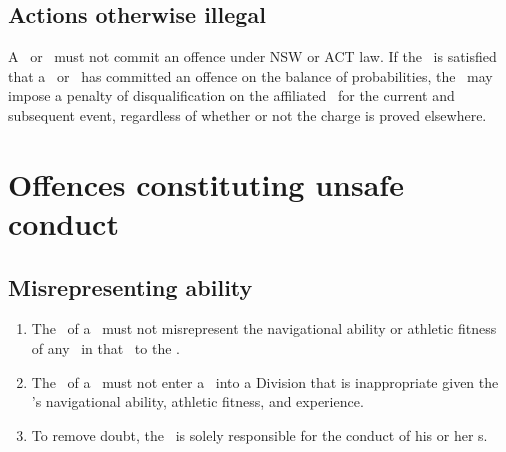 \documentclass[12pt]{report}
\begin{document}
  \section{Actions otherwise illegal}
  \begin{fenumerate}\item
  A \competitor\ or \spectator\ must not commit an offence under NSW or ACT law. If the \Referee\ is satisfied that a \competitor\ or \spectator\ has committed an offence on the balance of probabilities, the \Referee\ may impose a penalty of disqualification on the affiliated \residence\ for the current and subsequent event, regardless of whether or not the charge is proved elsewhere.\end{fenumerate}
  \chapter{Offences constituting unsafe conduct}
  \section{Misrepresenting ability}
  \begin{enumerate}
    \item The \Captain\ of a \squad\ must not misrepresent the navigational ability or athletic fitness of any \competitor\ in that \squad\ to the \RaceDirector.

    \item The \Captain\ of a \squad\ must not enter a \team\ into a Division that is inappropriate given the \team's navigational ability, athletic fitness, and experience.

    \item To remove doubt, the \Captain\ is solely responsible for the conduct of his or her \competitor s.
  \end{enumerate}
\end{document}

